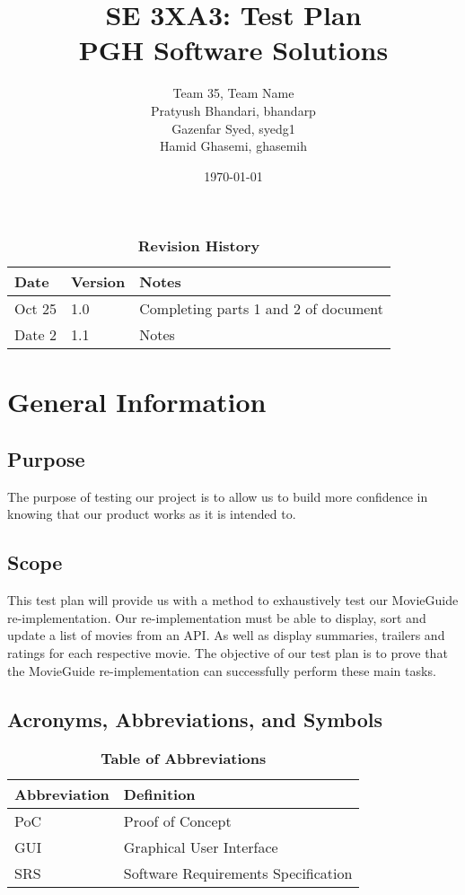 \documentclass[12pt, titlepage]{article}
\title{SE 3XA3: Test Plan\\PGH Software Solutions}
\author{Team 35, Team Name
		\\ Pratyush Bhandari, bhandarp
		\\ Gazenfar Syed, syedg1
		\\ Hamid Ghasemi, ghasemih}
\date{\today}
\begin{document}
\maketitle

\tableofcontents
\listoftables
\listoffigures

\begin{table}[bp]
\caption{\bf Revision History}
\begin{tabularx}{\textwidth}{p{3cm}p{2cm}X}
\toprule {\bf Date} & {\bf Version} & {\bf Notes}\\
\midrule
Oct 25 & 1.0 & Completing parts 1 and 2 of document\\
Date 2 & 1.1 & Notes\\
\bottomrule
\end{tabularx}
\end{table}

\newpage



\section{General Information}

\subsection{Purpose}
The purpose of testing our project is to allow us to build more confidence in knowing that our product works as it is intended to.

\subsection{Scope}
This test plan will provide us with a method to exhaustively test our MovieGuide re-implementation. Our re-implementation must be able to display, sort and update a list of movies from an API. As well as display summaries, trailers and ratings for each respective movie. The objective of our test plan is to prove that the MovieGuide re-implementation can successfully perform these main tasks. 


\subsection{Acronyms, Abbreviations, and Symbols}
	
\begin{table}[hbp]
\caption{\textbf{Table of Abbreviations}} \label{Table}

\begin{tabularx}{\textwidth}{p{3cm}X}
\toprule
\textbf{Abbreviation} & \textbf{Definition} \\
\midrule
PoC & Proof of Concept\\
GUI & Graphical User Interface\\
SRS & Software Requirements Specification\\
\bottomrule
\end{tabularx}

\end{table}
\end{document}

